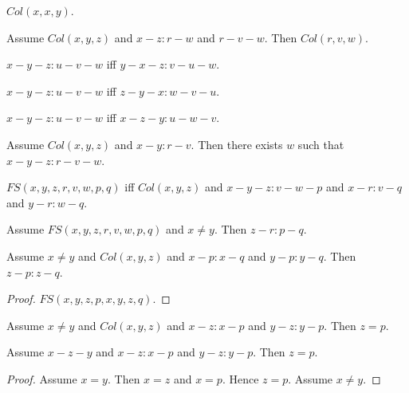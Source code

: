 \documentclass{article}
\begin{document}
\begin{forthel}
    \begin{lemma}[L4o12]
      $Col(x,x,y)$.
    \end{lemma}

    \begin{lemma}[L4o13]
      Assume $Col(x,y,z)$ and $x-z : r-w$ and $r-v-w$. Then $Col(r,v,w)$.
    \end{lemma}

    \begin{lemma}[L4o14o1]
      $x-y-z : u-v-w$ iff $y-x-z : v-u-w$.
    \end{lemma}

    \begin{lemma}[L4o14o2]
      $x-y-z : u-v-w$ iff $z-y-x : w-v-u$.
    \end{lemma}

    \begin{lemma}[L4o14o3]
      $x-y-z : u-v-w$ iff $x-z-y : u-w-v$.
    \end{lemma}

    \begin{axiom}[L4o14]
      Assume $Col(x,y,z)$ and $x-y : r-v$. Then there exists $w$ such that $x-y-z : r-v-w$.
    \end{axiom}

    \begin{definition}[L4o15]
      $FS(x,y,z,r,v,w,p,q)$ iff $Col(x,y,z)$ and $x-y-z : v-w-p$ and $x-r : v-q$ and $y-r : w-q$.
    \end{definition}

    \begin{axiom}[L4o16]
      Assume $FS(x,y,z,r,v,w,p,q)$ and $x \neq y$. Then $z-r : p-q$.
    \end{axiom}


    \begin{lemma}[L4o17]
      Assume $x \neq y$ and $Col(x,y,z)$ and $x-p : x-q$ and $y-p : y-q$. Then $z-p : z-q$.
    \end{lemma}
    \begin{proof}
    	$FS(x,y,z,p,x,y,z,q)$.
    \end{proof}


    \begin{lemma}[L4o18]
      Assume $x \neq y$ and $Col(x,y,z)$ and $x-z : x-p$ and $y-z : y-p$. Then $z = p$.
    \end{lemma}

    \begin{lemma}[L4o19]
      Assume $x-z-y$ and $x-z : x-p$ and $y-z : y-p$. Then $z = p$.
    \end{lemma}
    \begin{proof}
      Assume $x = y$. Then $x = z$ and $x = p$. Hence $z = p$. Assume $x \neq y$.
    \end{proof}
  \end{forthel}
\end{document}
